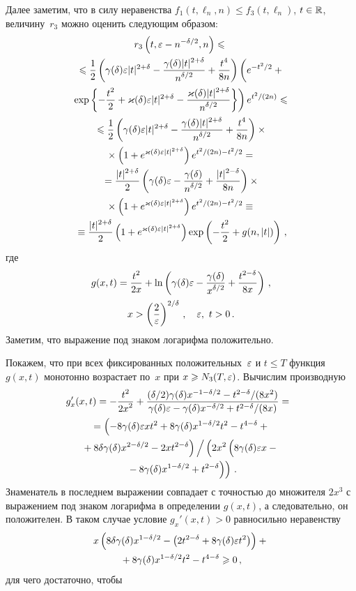 \begin{multicols}{2}
Далее заметим, что в силу неравенства $f_1(t,\ell_n,n)\le
f_3(t,\ell_n)$, $t\in\mathbb R$, величину~$r_3$ можно оценить следующим
образом:
\begin{multline*}
r_3\left(t,\eps-n^{-\delta/2},n\right)\le{}\\
{}\le \fr{1}{2} \left( \gd
\eps|t|^{2+\delta} - \fr{\gd |t|^{2+\delta}}{n^{\delta/2}} +
\fr{t^4}{8n}\right) \left(
\vphantom{\fr{t^2}{2}} e^{-{t^2}/{2}} +{}\right.\\
{}\left. \exp \left\{-\fr{t^2}{2} +
\varkappa(\delta) \eps |t|^{2+\delta} - \fr{\varkappa(\delta)
|t|^{2+\delta}}{n^{\delta/2}}\right\} \right) e^{t^2/(2n)} \le{}
\\
{}\le \fr{1}{2} \left( \gd \eps|t|^{2+\delta} - \fr{\gd
|t|^{2+\delta}}{n^{\delta/2}} + \fr{t^4}{8n}\right)\times{}\\
{}\times \left( 1 +
e^{\varkappa(\delta) \eps |t|^{2+\delta}}\right)e^{t^2/(2n)-t^2/2} ={}
\\
{}= \fr{|t|^{2+\delta}}{2} \left( \gd \eps - \fr{\gd}{n^{\delta/2}}
+ \fr{|t|^{2 - \delta}}{8n}\right)\times{}\\
{}\times \left( 1 + e^{\varkappa(\delta)
\eps |t|^{2+\delta}}\right) e^{t^2/(2n)-t^2/2} \equiv{}
\\
{}\equiv \fr{|t|^{2+\delta}}{2} \left( 1 + e^{\varkappa(\delta) \eps
|t|^{2+\delta}}\right) \exp \left( -\fr{t^2}{2} + g(n, |t|)
\right)\,,
\end{multline*}
где
\begin{multline*}
g(x, t) = \displaystyle\frac{\displaystyle t^2\mathstrut}{\displaystyle 2x\mathstrut} + \ln \left( \gamma(\delta)\varepsilon  -
\displaystyle\frac{\displaystyle \gamma(\delta)\mathstrut}{\displaystyle x^{{\delta}/{2}}\mathstrut} + \displaystyle\frac{\displaystyle t^{2 - \delta}\mathstrut}{\displaystyle 8x\mathstrut}
\right)\,,\\
 x>\left(\displaystyle\frac{\displaystyle 2\mathstrut}{\displaystyle \varepsilon\mathstrut}\right)^{2/\delta}\,,\quad  \varepsilon,\ t > 0\,.
\end{multline*}
Заметим, что выражение под знаком логарифма положительно.

Покажем, что при всех фиксированных положительных~$\varepsilon$ и $t\le T$
функция~$g(x, t)$ монотонно возрастает по~$x$ при $x \geqslant
N_3(T,\varepsilon)$. Вычислим производную
\begin{multline*}
\!\!\!\!g_x' (x, t) = -\fr{t^2}{2x^2} + \frac{(\delta/2) \gd
x^{-1-\d/2} - t^{2-\delta}/(8x^2)}{\gd\eps - {\gd}{x^{-\d/2}}
+ {t^{2-\delta}}/(8x)}=
\\
{}= \left (-8\gd\eps x t^2 + 8\gd x^{1-\d/2}t^2 - t^{4-\delta} +{}\right.\\
\left.{}+ 8\d\gd
x^{2-\d/2} - 2x t^{2-\delta}\right) \Big/
\left (
\vphantom{8\gd x^{1-\d/2} +
t^{2-\delta}}
2x^2 \left(
\vphantom{8\gd x^{1-\d/2} +
t^{2-\delta}}
8\gd\eps x -{}\right.\right.\\
\left.\left.{}- 8\gd x^{1-\d/2} +
t^{2-\delta}\right)\right)\,.
\end{multline*}
Знаменатель в последнем выражении совпадает с точностью до множителя
$2x^3$ с выражением под знаком логарифма в определении $g(x,t)$, а
следовательно, он положителен. В таком случае условие $g_x'(x,t)>0$
равносильно неравенству
\begin{multline*}
x\left(8\delta\gamma(\delta) x^{1-\delta/2} - \left(2t^{2-\delta} + 8\gamma(\delta)\varepsilon t^2\right)\right) +{}\\
{}+ 8\gamma(\delta)
x^{1-\delta/2} t^2 - t^{4-\delta} \geqslant 0\,,
\end{multline*}
для чего достаточно, чтобы


\end{multicols}
